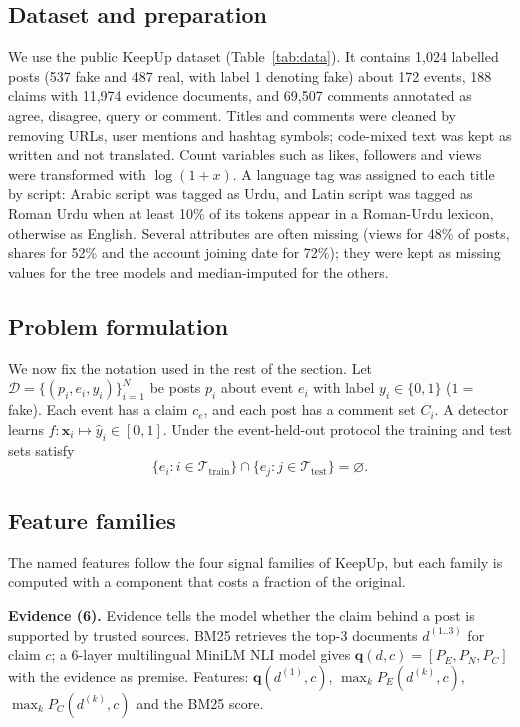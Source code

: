 \documentclass[conference]{IEEEtran}
\begin{document}
\subsection{Dataset and preparation}
We use the public KeepUp dataset (Table~\ref{tab:data}). It contains 1,024 labelled posts (537 fake and 487 real,
with label 1 denoting fake) about 172 events, 188 claims with 11,974 evidence documents, and 69,507 comments
annotated as agree, disagree, query or comment. Titles and comments were cleaned by removing URLs, user mentions
and hashtag symbols; code-mixed text was kept as written and not translated. Count variables such as likes,
followers and views were transformed with $\log(1+x)$. A language tag was assigned to each title by script:
Arabic script was tagged as Urdu, and Latin script was tagged as Roman Urdu when at least 10\% of its tokens
appear in a Roman-Urdu lexicon, otherwise as English. Several attributes are often missing (views for 48\% of
posts, shares for 52\% and the account joining date for 72\%); they were kept as missing values for the tree
models and median-imputed for the others.



\subsection{Problem formulation}
We now fix the notation used in the rest of the section.
Let $\mathcal{D}=\{(p_i, e_i, y_i)\}_{i=1}^{N}$ be posts $p_i$ about event $e_i$ with label
$y_i\in\{0,1\}$ ($1=$ fake). Each event has a claim $c_{e}$, and each post has a comment set $C_i$.
A detector learns $f:\mathbf{x}_i\mapsto \hat{y}_i\in[0,1]$. Under the event-held-out protocol the
training and test sets satisfy
\begin{equation}
\{e_i : i\in\mathcal{T}_{\text{train}}\}\cap\{e_j : j\in\mathcal{T}_{\text{test}}\}=\varnothing .
\label{eq:eventsplit}
\end{equation}

\subsection{Feature families}
The named features follow the four signal families of KeepUp, but each family is computed with a component
that costs a fraction of the original.

\textbf{Evidence (6).} Evidence tells the model whether the claim behind a post is supported by trusted
sources. BM25 \cite{robertson2009bm25} retrieves the top-3 documents $d^{(1..3)}$ for claim $c$;
a 6-layer multilingual MiniLM NLI model \cite{wang2020minilm,conneau2018xnli} gives
$\mathbf{q}(d,c)=[P_E,P_N,P_C]$ with the evidence as premise. Features: $\mathbf{q}(d^{(1)},c)$,
$\max_k P_E(d^{(k)},c)$, $\max_k P_C(d^{(k)},c)$ and the BM25 score.
\end{document}
